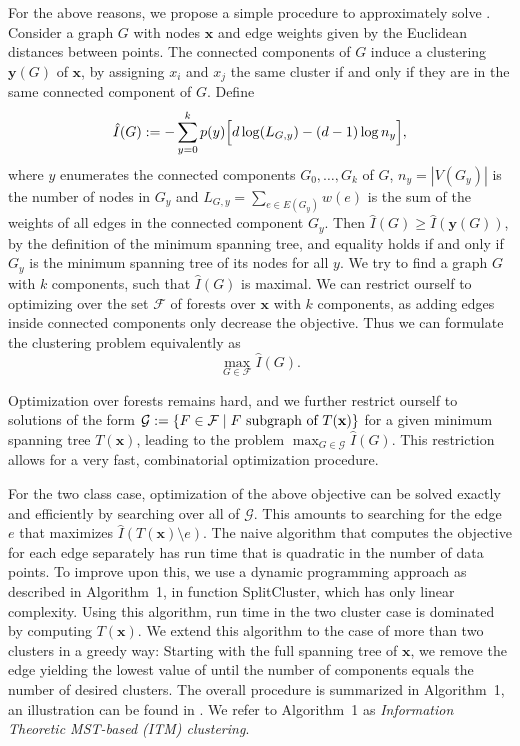 For the above reasons, we propose a simple procedure to approximately solve
.
Consider a graph $G$ with nodes $\mathbf{x}$ and edge weights given by the
Euclidean distances between points.  The connected components of $G$ induce a
clustering $\mathbf{y}(G)$ of $\mathbf{x}$, by assigning $x_i$ and $x_j$ the
same cluster if and only if they are in the same connected component of $G$.
Define
\begin{align}\label{eq:graphobjective}
\hat{I}(G) := - \sum_{y=0}^k p(y) \Bigl[ d \log(L_{G,y}) - (d-1) \log{n_y} \Bigr],
\end{align}
where $y$ enumerates the connected components $G_0, \dotsc, G_k$ of $G$, $n_y =
|V(G_y)|$ is the number of nodes in $G_y$ and $L_{G,y} = \sum_{e \in E(G_y)}
w(e)$ is the sum of the weights of all edges in the connected component $G_y$.
%
Then $\hat{I}(G) \geq \hat{I}(\mathbf{y}(G))$, by the definition of
the minimum spanning tree, and equality holds if and only if $G_y$ is the
minimum spanning tree of its nodes for all $y$.
%
We try to find a graph $G$ with $k$ components, such that $\hat{I}(G)$ is maximal. We can restrict
ourself to optimizing over the set $\mathcal{F}$ of forests over $\mathbf{x}$ with $k$ components,
as adding edges inside connected components only decrease the objective.
Thus we can formulate the clustering problem equivalently as
\begin{equation}
    \max_{G \in \mathcal{F}} \hat{I}(G).
\end{equation}


Optimization over forests remains hard, and we further restrict ourself to
solutions of the form $\mathcal{G} := \{ F \in \mathcal{F} \mid F \text{\ subgraph of\
} T(\mathbf{x}) \}$ for a given minimum spanning tree $T(\mathbf{x})$, leading to
the problem $\displaystyle \max_{G \in \mathcal{G}} \hat{I}(G)$.  This restriction allows for
a very fast, combinatorial optimization procedure.


For the two class case, optimization of the above objective can be solved
exactly and efficiently by searching over all of $\mathcal{G}$.
This amounts to searching for the edge $e$ that maximizes $\hat{I}(T(\mathbf{x})
\setminus e)$. The naive algorithm that computes the objective for each edge
separately has run time that is quadratic in the number of data points.  To
improve upon this, we use a dynamic programming approach as described in
Algorithm~1, in function SplitCluster, which has only linear
complexity. Using this algorithm, run time in the two cluster case is dominated
by computing $T(\mathbf{x})$.
%
We extend this algorithm to the case of more than two clusters in a greedy way:
Starting with the full spanning tree of $\mathbf{x}$, we remove the edge
yielding the lowest value of \Eqref{graphobjective} until the number of
components equals the number of desired clusters. The overall procedure is
summarized in Algorithm~1, an illustration can be found in
. We refer to Algorithm~1 as \emph{Information
Theoretic MST-based (ITM) clustering}.

